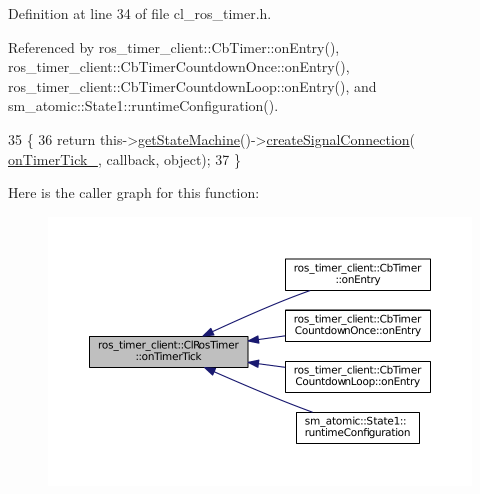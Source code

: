 Definition at line 34 of file cl\+\_\+ros\+\_\+timer.\+h.



Referenced by ros\+\_\+timer\+\_\+client\+::\+Cb\+Timer\+::on\+Entry(), ros\+\_\+timer\+\_\+client\+::\+Cb\+Timer\+Countdown\+Once\+::on\+Entry(), ros\+\_\+timer\+\_\+client\+::\+Cb\+Timer\+Countdown\+Loop\+::on\+Entry(), and sm\+\_\+atomic\+::\+State1\+::runtime\+Configuration().


\begin{DoxyCode}
35     \{
36         \textcolor{keywordflow}{return} this->\hyperlink{classsmacc_1_1ISmaccClient_aec51d4712404cb9882b86e4c854bb93a}{getStateMachine}()->\hyperlink{classsmacc_1_1ISmaccStateMachine_adf0f42ade0c65cc471960fe2a7c42da2}{createSignalConnection}(
      \hyperlink{classros__timer__client_1_1ClRosTimer_a8c7a2ee6e8e8512b3f997e5560c0dc18}{onTimerTick\_}, callback, \textcolor{keywordtype}{object});
37     \}
\end{DoxyCode}


Here is the caller graph for this function\+:
\nopagebreak
\begin{figure}[H]
\begin{center}
\leavevmode
\includegraphics[width=350pt]{classros__timer__client_1_1ClRosTimer_a06ecf6427b5df59f29879ab3bd1f120c_icgraph}
\end{center}
\end{figure}


